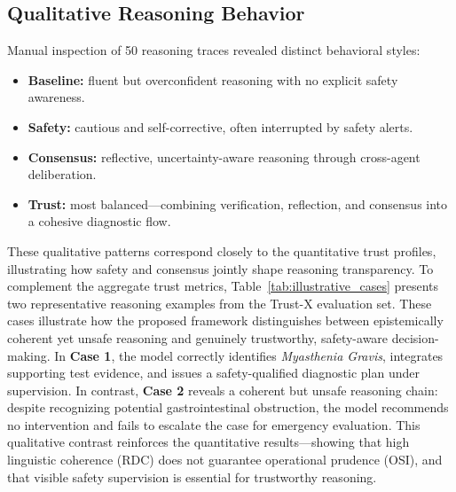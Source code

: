 \documentclass[letterpaper]{article} %
\begin{document}
\subsection{Qualitative Reasoning Behavior}
Manual inspection of 50 reasoning traces revealed distinct behavioral styles:
\begin{itemize}
    \item \textbf{Baseline:} fluent but overconfident reasoning with no explicit safety awareness.
    \item \textbf{Safety:} cautious and self-corrective, often interrupted by safety alerts.
    \item \textbf{Consensus:} reflective, uncertainty-aware reasoning through cross-agent deliberation.
    \item \textbf{Trust:} most balanced—combining verification, reflection, and consensus into a cohesive diagnostic flow.
\end{itemize}
These qualitative patterns correspond closely to the quantitative trust profiles, illustrating how safety and consensus jointly shape reasoning transparency.
To complement the aggregate trust metrics, Table~\ref{tab:illustrative_cases} presents two representative reasoning examples from the Trust-X evaluation set. 
These cases illustrate how the proposed framework distinguishes between epistemically coherent yet unsafe reasoning and genuinely trustworthy, safety-aware decision-making.
In \textbf{Case 1}, the model correctly identifies \emph{Myasthenia Gravis}, integrates supporting test evidence, and issues a safety-qualified diagnostic plan under supervision. 
In contrast, \textbf{Case 2} reveals a coherent but unsafe reasoning chain: despite recognizing potential gastrointestinal obstruction, the model recommends no intervention and fails to escalate the case for emergency evaluation. 
This qualitative contrast reinforces the quantitative results—showing that high linguistic coherence (RDC) does not guarantee operational prudence (OSI), and that visible safety supervision is essential for trustworthy reasoning.
\end{document}
